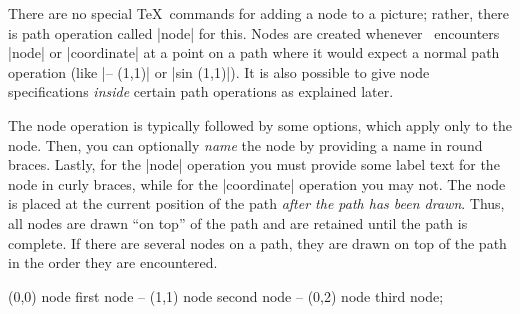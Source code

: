 There are no special \TeX\ commands for adding a node to a picture; rather,
there is path operation called |node| for this. Nodes are created
whenever \tikzname\ encounters |node| or |coordinate| at a point on a
path where it would expect a normal path operation (like |-- (1,1)| or
|sin (1,1)|). It is also possible to give node specifications
\emph{inside} certain path operations as explained later.

The node operation is typically followed by some options, which apply
only to the node. Then, you can optionally \emph{name} the node by
providing a name in round braces. Lastly, for the |node| operation you
must provide some label text for the node in curly braces, while for
the |coordinate| operation you may not. The node is placed at the
current position of the path \emph{after the path has been
  drawn}. Thus, all nodes are drawn ``on top'' of the path and are
retained until the path is complete. If there are several nodes on a
path, they are drawn on top of the path in the order they are
encountered.

\begin{codeexample}[]
\tikz \fill[fill=examplefill]
     (0,0) node {first node}
  -- (1,1) node {second node}
  -- (0,2) node {third node};
\end{codeexample}

